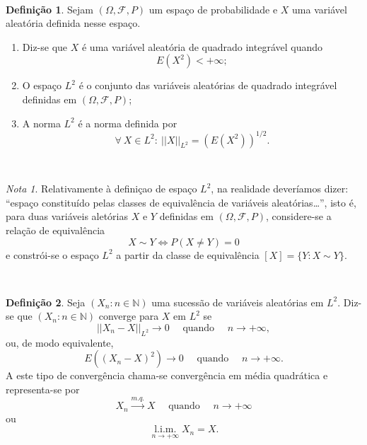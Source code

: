 \documentclass[
  11pt,
  a4paper,
]{book}
\theoremstyle{definition}
\newtheorem{definition}{Definição}[chapter]
\theoremstyle{definition}
\theoremstyle{definition}
\theoremstyle{definition}
\theoremstyle{remark}
\newtheorem*{remark}{Nota }
\begin{document}
\(\,\)

\begin{definition}

Sejam \((\Omega,\mathcal{F},P)\) um espaço de probabilidade e \(X\) uma variável aleatória definida nesse espaço.

\begin{enumerate}
\def\labelenumi{\roman{enumi})}
\item
  Diz-se que \(X\) é uma variável aleatória de quadrado integrável quando
  \[E(X^2)<+\infty;\]
\item
  O espaço \(L^2\) é o conjunto das variáveis aleatórias de quadrado integrável definidas em \((\Omega,\mathcal{F},P)\);
\item
  A norma \(L^2\) é a norma definida por
  \[\forall ~ X \in L^2:~ ||X||_{L^2} = \left(E(X^2)\right)^{1/2}.\]
\end{enumerate}

\end{definition}

\(\,\)

\begin{remark}
Relativamente à definiçao de espaço \(L^2\), na realidade deveríamos dizer: ``espaço constituído pelas classes de equivalência de variáveis aleatórias\ldots{}'', isto é, para duas variáveis aletórias \(X\) e \(Y\) definidas em \((\Omega,\mathcal{F},P)\), considere-se a relação de equivalência
\[X \sim Y \iff P(X \neq Y)=0\]
e constrói-se o espaço \(L^2\) a partir da classe de equivalência \([X]=\{Y: X \sim Y\}\).
\end{remark}

\(\,\)

\begin{definition}
Seja \((X_n: n \in \mathbb{N})\) uma sucessão de variáveis aleatórias em \(L^2\). Diz-se que \((X_n: n \in \mathbb{N})\) converge para \(X\) em \(L^2\) se
\[||X_n-X||_{L^2}\rightarrow 0 \quad \text{ quando } \quad n \to +\infty,\]
ou, de modo equivalente,
\[E((X_n-X)^2) \to 0 \quad \text{ quando } \quad n \to +\infty.\]
A este tipo de convergência chama-se convergência em média quadrática e representa-se por
\[X_n \xrightarrow{m.q.}X \quad \text{ quando } \quad n \to +\infty\]
ou
\[\mathop{l.i.m.}\limits_{n \to +\infty}X_n=X.\]
\end{definition}

\(\,\)
\end{document}
